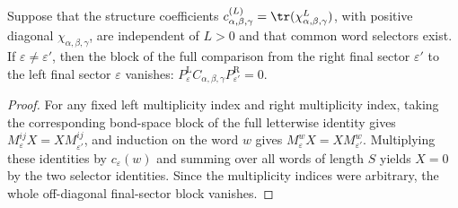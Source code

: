 \begin{lemma}%
    \label{thm:mpdo_triple_fusion_comparison_final_sector_vanishing}
    \leanok
    Suppose that the structure coefficients
    $c_{\alpha,\beta,\gamma}^{(L)}
        =\tr(\chi_{\alpha,\beta,\gamma}^{L})$,
    with positive diagonal $\chi_{\alpha,\beta,\gamma}$, are independent of
    $L>0$ and that common word selectors exist. If
    $\varepsilon\ne\varepsilon'$, then the block of the full comparison from
    the right final sector $\varepsilon'$ to the left final sector
    $\varepsilon$ vanishes:
    $P^{\mathrm L}_{\varepsilon}
        C_{\alpha,\beta,\gamma}
        P^{\mathrm R}_{\varepsilon'}=0$.
\end{lemma}
\begin{proof}\leanok
    For any fixed left multiplicity index and right multiplicity index, taking
    the corresponding bond-space block of the full letterwise identity gives
    $M_\varepsilon^{ij}X=X M_{\varepsilon'}^{ij}$, and induction on the word
    $w$ gives $M_\varepsilon^w X = X M_{\varepsilon'}^w$. Multiplying these
    identities by $c_\varepsilon(w)$ and summing over all words of length $S$
    yields $X=0$ by the two selector identities. Since the multiplicity
    indices were arbitrary, the whole off-diagonal final-sector block vanishes.
\end{proof}

